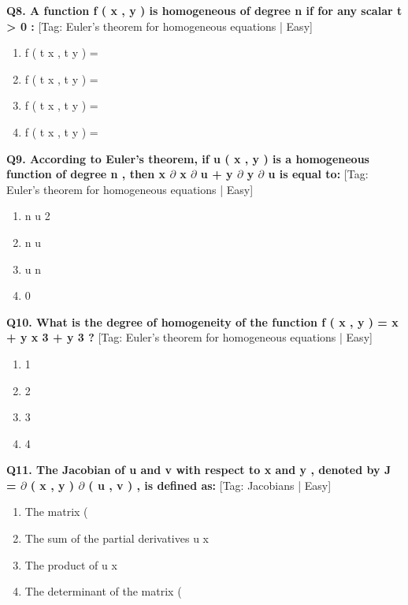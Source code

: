 \noindent\textbf{Q8. A function f ( x , y ) is homogeneous of degree n if for any scalar t > 0 :} \hfill [Tag: Euler's theorem for homogeneous equations | Easy]
\begin{enumerate}[label=(\alph*),topsep=2pt,itemsep=1pt,partopsep=0pt,parsep=0pt]
    \item {{f ( t x , t y ) =}}
    \item {{f ( t x , t y ) =}}
    \item {{f ( t x , t y ) =}}
    \item {{f ( t x , t y ) =}}
\end{enumerate}
\vspace{2mm}

\noindent\textbf{Q9. According to Euler's theorem, if u ( x , y ) is a homogeneous function of degree n , then x $\partial$ x $\partial$ u + y $\partial$ y $\partial$ u is equal to:} \hfill [Tag: Euler's theorem for homogeneous equations | Easy]
\begin{enumerate}[label=(\alph*),topsep=2pt,itemsep=1pt,partopsep=0pt,parsep=0pt]
    \item {{n u 2}}
    \item {{n u}}
    \item {{u n}}
    \item {{0}}
\end{enumerate}
\vspace{2mm}

\noindent\textbf{Q10. What is the degree of homogeneity of the function f ( x , y ) = x + y x 3 + y 3 ?} \hfill [Tag: Euler's theorem for homogeneous equations | Easy]
\begin{enumerate}[label=(\alph*),topsep=2pt,itemsep=1pt,partopsep=0pt,parsep=0pt]
    \item {{1}}
    \item {{2}}
    \item {{3}}
    \item {{4}}
\end{enumerate}
\vspace{2mm}

\noindent\textbf{Q11. The Jacobian of u and v with respect to x and y , denoted by J = $\partial$ ( x , y ) $\partial$ ( u , v ) , is defined as:} \hfill [Tag: Jacobians | Easy]
\begin{enumerate}[label=(\alph*),topsep=2pt,itemsep=1pt,partopsep=0pt,parsep=0pt]
    \item {{The matrix (}}
    \item {{The sum of the partial derivatives u x}}
    \item {{The product of u x}}
    \item {{The determinant of the matrix (}}
\end{enumerate}
\vspace{2mm}

